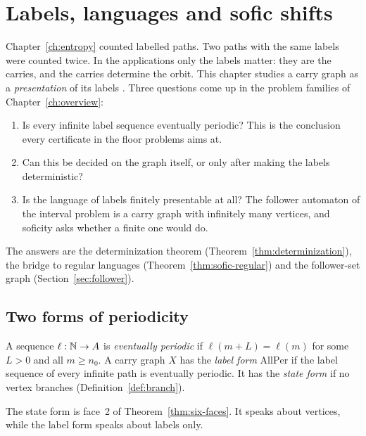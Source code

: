 \chapter{Labels, languages and sofic shifts}\label{ch:sofic}

Chapter~\ref{ch:entropy} counted labelled paths. Two paths with the same labels were counted
twice. In the applications only the labels matter: they are the carries, and the carries
determine the orbit. This chapter studies a carry graph as a \emph{presentation} of its labels
\cite[ch.~3]{LM95}. Three questions come up in the problem families of
Chapter~\ref{ch:overview}:
\begin{enumerate}[label=(\arabic*)]
\item Is every infinite label sequence eventually periodic? This is the conclusion every
  certificate in the floor problems aims at.
\item Can this be decided on the graph itself, or only after making the labels deterministic?
\item Is the language of labels finitely presentable at all? The follower automaton of the
  interval problem is a carry graph with infinitely many vertices, and soficity asks whether a
  finite one would do.
\end{enumerate}
The answers are the determinization theorem (Theorem~\ref{thm:determinization}), the bridge
to regular languages (Theorem~\ref{thm:sofic-regular}) and the follower-set graph
(Section~\ref{sec:follower}).

\section{Two forms of periodicity}

\begin{definition}\label{def:allper}
A sequence \(\ell:\mathbb{N}\to A\) is \emph{eventually periodic} if \(\ell(m+L)=\ell(m)\) for some
\(L>0\) and all \(m\ge n_0\). A carry graph \(X\) has the \emph{label form} \(\mathrm{AllPer}\) if
the label sequence of every infinite path is eventually periodic. It has the \emph{state form}
if no vertex branches (Definition~\ref{def:branch}).
\end{definition}

The state form is face~2 of Theorem~\ref{thm:six-faces}. It speaks about vertices, while the
label form speaks about labels only.

